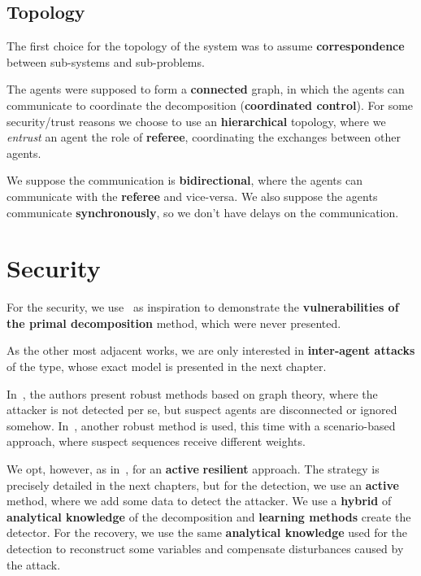 \documentclass[../main.tex]{subfiles}
\begin{document}
\newpage
\subsection*{Topology}\label{sec:decomposition_chosen}
The first choice for the topology of the system was to assume \textbf{correspondence} between sub-systems and sub-problems.

The agents were supposed to form a \textbf{connected} graph, in which the agents can communicate to coordinate the decomposition (\textbf{coordinated control}).
For some security/trust reasons we choose to use an \textbf{hierarchical} topology, where we \emph{entrust} an agent the role of \textbf{referee}, coordinating the exchanges between other agents.

We suppose the communication is \textbf{bidirectional}, where the agents can communicate with the \textbf{referee} and vice-versa.
We also suppose the agents communicate \textbf{synchronously}, so we don't have delays on the communication.

\section*{Security}
For the security, we use~\cite{VelardeEtAl2017b,ChanfreutEtAl2018} as inspiration to demonstrate the \textbf{vulnerabilities of the primal decomposition} method, which were never presented.

As the other most adjacent works, we are only interested in \textbf{inter-agent attacks} of the \textbf{\fdi{}} type, whose exact model is presented in the next chapter.

In~\cite{VelardeEtAl2017b,VelardeEtAl2018}, the authors present robust methods based on graph theory, where the attacker is not detected per se, but suspect agents are disconnected or ignored somehow.
In~\cite{VelardeEtAl2017a,MaestreEtAl2021}, another robust method is used, this time with a scenario-based approach, where suspect sequences receive different weights.

We opt, however, as in~\cite{AnandutaEtAl2018,AnandutaEtAl2019,AnandutaEtAl2020},
for an \textbf{active} \textbf{resilient} approach.
The strategy is precisely detailed in the next chapters, but for the detection, we use an \textbf{active} method, where we add some data to detect the attacker.
We use a \textbf{hybrid} of \textbf{analytical knowledge} of the decomposition and \textbf{learning methods} create the detector.
For the recovery, we use the same \textbf{analytical knowledge} used for the detection to reconstruct some variables and compensate disturbances caused by the attack.
\end{document}
